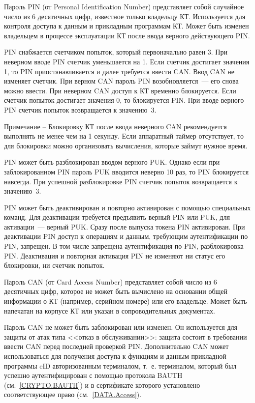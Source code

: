 Пароль PIN (от Personal Identification Number)
представляет собой случайное число из 6 десятичных цифр,
известное только владельцу КТ. Используется для контроля доступа к данным и 
прикладным программам КТ. Может быть изменен владельцем в процессе
эксплуатации КТ после ввода верного действующего PIN.

PIN снабжается счетчиком попыток, который первоначально равен 3. При 
неверном вводе PIN счетчик уменьшается на 1. Если счетчик достигает 
значения 1, то PIN приостанавливается и далее требуется ввести CAN. 
Ввод CAN не изменяет счетчик. При верном CAN пароль PIN возобновляется~--- 
его снова можно ввести. При неверном CAN доступ к КТ временно блокируется. 
Если счетчик попыток достигает значения 0, то блокируется PIN. 
%
При вводе верного PIN счетчик попыток возвращается к значению~$3$.

\vskip6pt

\begin{note}
Примечание -- Блокировку КТ после ввода неверного CAN рекомендуется выполнять 
не менее чем на 1 секунду. Если аппаратный таймер отсутствует, то для 
блокировки можно организовать вычисления, которые займут нужное время. 
\end{note}

\vskip6pt

PIN может быть разблокирован вводом верного PUK. Однако если при заблокированном
PIN пароль PUK вводится неверно 10 раз, то PIN блокируется навсегда.
%
При успешной разблокировке PIN счетчик попыток возвращается к значению~$3$. 

PIN может быть деактивирован и повторно активирован с помощью специальных команд.
Для деактивации требуется предъявить верный PIN или PUK, 
для активации~--- верный PUK. Сразу после выпуска токена PIN активирован. 
При деактивации PIN доступ к операциям и данным, требующим аутентификации по 
PIN, запрещен. В том числе запрещена аутентификация по PIN, разблокировка PIN.
Деактивация и повторная активация PIN не изменяют ни статус его блокировки, 
ни счетчик попыток. 

Пароль CAN (от Card Access Number) представляет собой число из 6 десятичных 
цифр, которое не может быть вычислено на основании общей информации о КТ 
(например, серийном номере) или его владельце. Может быть напечатан на корпусе 
КТ или указан в сопроводительных документах. 

Пароль CAN не может быть заблокирован или изменен. Он используется для защиты 
от атак типа <<отказ в обслуживании>>: защита состоит в требовании ввести CAN перед 
последней проверкой PIN. Дополнительно CAN может использоваться для 
получения доступа к функциям и данным прикладной программы eID 
авторизованным терминалом, т.~е. терминалом, который был успешно 
аутентифицирован с помощью протокола BAUTH (см.~\ref{CRYPTO.BAUTH}) и в 
сертификате которого установлено соответствующее право (см.~\ref{DATA.Access}). 

